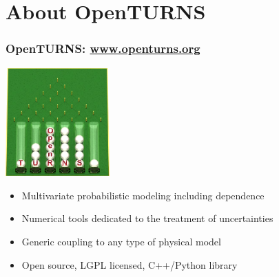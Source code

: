 \documentclass{beamer}
\begin{document}
\section{About OpenTURNS}
\begin{frame}
    \frametitle{OpenTURNS: \url{www.openturns.org}}


        \begin{center}
        \includegraphics[width=0.3\textwidth]{figures/logo-ot.jpg}
        \end{center}

    \begin{itemize}
    \item Multivariate probabilistic modeling including dependence
    \item Numerical tools dedicated to the treatment of uncertainties
    \item Generic coupling to any type of physical model
    \item Open source, LGPL licensed, C++/Python library
    \end{itemize}


    \end{frame}

\end{document}
